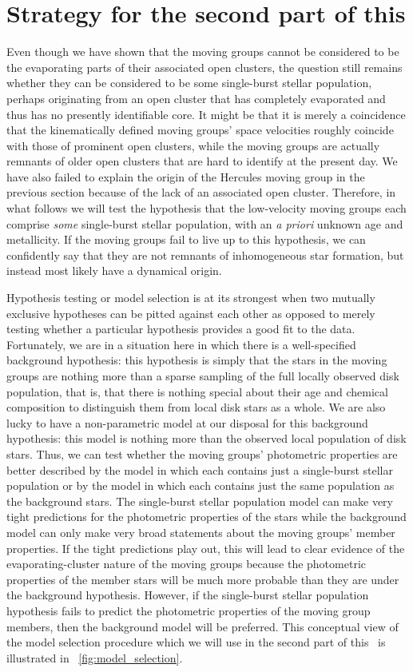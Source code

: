 \section{Strategy for the second part of this \protect\chaptername}\label{sec:strategy}

Even though we have shown that the moving groups cannot be considered
to be the evaporating parts of their associated open clusters, the
question still remains whether they can be considered to be some
single-burst stellar population, perhaps originating from an open
cluster that has completely evaporated and thus has no presently
identifiable core. It might be that it is merely a coincidence that
the kinematically defined moving groups' space velocities roughly
coincide with those of prominent open clusters, while the moving
groups are actually remnants of older open clusters that are hard to
identify at the present day. We have also failed to explain the origin
of the Hercules moving group in the previous section because of the
lack of an associated open cluster. Therefore, in what follows we will
test the hypothesis that the low-velocity moving groups each comprise
\emph{some} single-burst stellar population, with an \emph{a priori}
unknown age and metallicity. If the moving groups fail to live up to
this hypothesis, we can confidently say that they are not remnants of
inhomogeneous star formation, but instead most likely have a dynamical
origin.

Hypothesis testing or model selection is at its strongest when two
mutually exclusive hypotheses can be pitted against each other as
opposed to merely testing whether a particular hypothesis provides a
good fit to the data. Fortunately, we are in a situation here in which
there is a well-specified background hypothesis: this hypothesis is
simply that the stars in the moving groups are nothing more than a
sparse sampling of the full locally observed disk population, that is,
that there is nothing special about their age and chemical composition
to distinguish them from local disk stars as a whole. We are also
lucky to have a non-parametric model at our disposal for this
background hypothesis: this model is nothing more than the observed
local population of disk stars. Thus, we can test whether the moving
groups' photometric properties are better described by the model in
which each contains just a single-burst stellar population or by the
model in which each contains just the same population as the
background stars. The single-burst stellar population model can make
very tight predictions for the photometric properties of the stars
while the background model can only make very broad statements about
the moving groups' member properties. If the tight predictions play
out, this will lead to clear evidence of the evaporating-cluster
nature of the moving groups because the photometric properties of the
member stars will be much more probable than they are under the
background hypothesis. However, if the single-burst stellar population
hypothesis fails to predict the photometric properties of the moving
group members, then the background model will be preferred. This
conceptual view of the model selection procedure which we will use in
the second part of this \chaptername\ is illustrated in
\figurename~\ref{fig:model_selection}.

